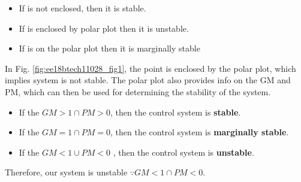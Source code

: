 \begin{enumerate}[label=\thesubsection.\arabic*.,ref=\thesubsection.\theenumi]
\begin{itemize}
    \item If   is not enclosed, then it is stable.
    \item If  is enclosed by polar plot then it is unstable. 
    \item If  is on the polar plot then it is marginally stable
    
    
\end{itemize}
In Fig. \ref{fig:ee18btech11028_fig1},  the point  is enclosed by the polar plot,
which implies system is not stable.  The polar plot also provides info on the GM and PM, which can then be used for determining the stability of the system.

\begin{itemize}
    \item If the $GM > 1 \cap PM > 0$,  then the control system is \textbf{stable}.
    \item If the $GM = 1\cap PM =0 $,  then the control system is  \textbf{marginally stable}.
    \item If the $GM < 1\cup  PM < 0$ , then the control system is \textbf{unstable}.
\end{itemize}

Therefore, our system is unstable $\because GM < 1\cap  PM < 0$.



\end{enumerate}
